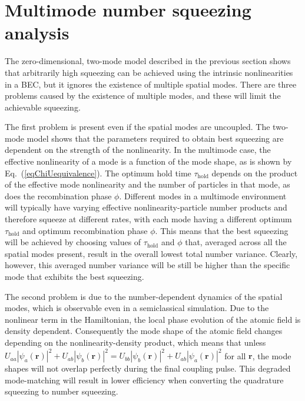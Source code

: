 \documentclass{iopart}
\begin{document}
\section{Multimode number squeezing analysis} \label{sec:MMdescription}

The zero-dimensional, two-mode model described in the previous section shows that arbitrarily high squeezing can be achieved using the intrinsic nonlinearities in a BEC, but it ignores the existence of multiple spatial modes.  There are three problems caused by the existence of multiple modes, and these will limit the achievable squeezing.

The first problem is present even if the spatial modes are uncoupled.  The two-mode model shows that the parameters required to obtain best squeezing are dependent on the strength of the nonlinearity. In the multimode case, the effective nonlinearity of a mode is a function of the mode shape, as is shown by Eq.~(\ref{eqChiUequivalence}). The optimum hold time $\tau_{\mathrm{hold}}$ depends on the product of the effective mode nonlinearity and the number of particles in that mode, as does the recombination phase $\phi$.  Different modes in a multimode environment will typically have varying effective nonlinearity-particle number products and therefore squeeze at different rates, with each mode having a different optimum $\tau_{\mathrm{hold}}$ and optimum recombination phase $\phi$. This means that the best squeezing will be achieved by choosing values of $\tau_{\mathrm{hold}}$ and $\phi$ that, averaged across all the spatial modes present, result in the overall lowest total number variance. Clearly, however, this averaged number variance will be still be higher than the specific mode that exhibits the best squeezing.

The second problem is due to the number-dependent dynamics of the spatial modes, which is observable even in a semiclassical simulation.  Due to the nonlinear term in the Hamiltonian, the local phase evolution of the atomic field is density dependent.  Consequently the mode shape of the atomic field changes depending on the nonlinearity-density product, which means that unless $U_{aa}|\psi_a({\mathbf{r}})|^2 + U_{ab}|\psi_b({\mathbf{r}})|^2 = U_{bb}|\psi_b({\mathbf{r}})|^2 + U_{ab}|\psi_a({\mathbf{r}})|^2$ for all ${\mathbf{r}}$, the mode shapes will not overlap perfectly during the final coupling pulse. This degraded mode-matching will result in lower efficiency when converting the quadrature squeezing to number squeezing. 
\end{document}

